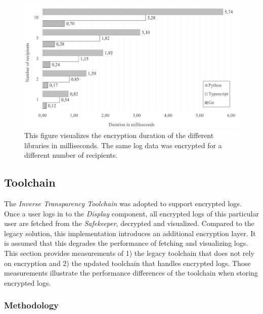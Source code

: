 \documentclass[../main.tex]{subfiles}
\begin{document}
\begin{figure}[ht]
    \includegraphics[scale=0.6]{../img/07/performance.png}
    \centering
    \caption[Encryption duration]{This figure visualizes the encryption duration of the different libraries in milliseconds. The same log data was encrypted for a different number of recipients.}
    \label{fig:performance}
\end{figure}

\subsection{Toolchain}
The \emph{Inverse Transparency Toolchain} was adopted to support encrypted logs.
Once a user logs in to the \emph{Display} component, all encrypted logs of this particular user are fetched from the \emph{Safekeeper}, decrypted and visualized.
Compared to the legacy solution, this implementation introduces an additional encryption layer.
It is assumed that this degrades the performance of fetching and visualizing logs.
This section provides measurements of 
1) the legacy toolchain that does not rely on encryption and
2) the updated toolchain that handles encrypted logs.
Those measurements illustrate the performance differences of the toolchain when storing encrypted logs.


\subsubsection{Methodology}
\end{document}
